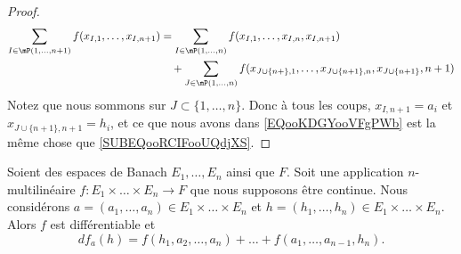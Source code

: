 \begin{proof}
\begin{equation}
\begin{aligned}[]
			\sum_{I\in\mP(1,\ldots,n+1)}f(x_{I,1},\ldots,x_{I,n+1}) & =\sum_{I\in\mP(1,\ldots,n)}f(x_{I,1},\ldots,x_{I,n}, x_{I,n+1})\nonumber                                    \\
			                                                        & \quad + \sum_{J\in\mP(1,\ldots,n)}f(x_{J\cup\{ n+ \},1},\ldots,x_{J\cup\{ n+1 \},n},x_{J\cup\{ n+1 \}},n+1)
		\end{aligned}
	\end{equation}
	Notez que nous sommons sur \( J\subset\{ 1,\ldots,n \}\). Donc à tous les coups, \( x_{I,n+1}=a_i\) et \( x_{J\cup\{ n+1 \},n+1}=h_i\), et ce que nous avons dans \eqref{EQooKDGYooVFgPWb} est la même chose que \eqref{SUBEQooRCIFooUQdjXS}.
\end{proof}


\begin{proposition}	\label{PROPooNDCPooWRdSQV}
	Soient des espaces de Banach \( E_1,\ldots,E_n\) ainsi que \( F\). Soit une application \( n\)-multilinéaire \(f \colon E_1\times \ldots\times E_n\to F  \) que nous supposons être continue. Nous considérons \( a=(a_1,\ldots,a_n)\in E_1\times\ldots\times E_n\) et \( h=(h_1,\ldots,h_n)\in E_1\times\ldots\times E_n\). Alors \( f\) est différentiable et
	\begin{equation}
		df_a(h)=f(h_1,a_2,\ldots,a_n)+\ldots+f(a_1,\ldots,a_{n-1},h_n).
	\end{equation}
\end{proposition}

